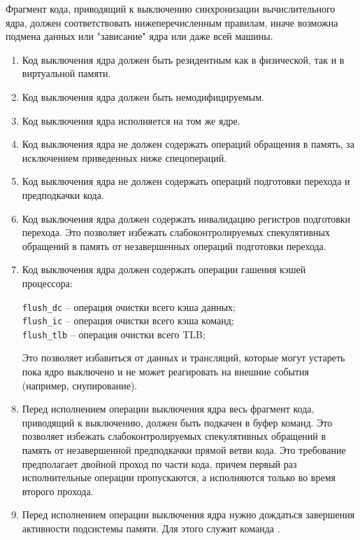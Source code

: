 \documentclass{article}
\begin{document}
Фрагмент кода, приводящий к выключению синхронизации вычислительного ядра,
должен соответствовать нижеперечисленным правилам, иначе возможна подмена данных
или "зависание" ядра или даже всей машины.
\begin{enumerate}

\item Код выключения ядра должен быть резидентным как в физической, так и в виртуальной памяти.

\item Код выключения ядра должен быть немодифицируемым.

\item Код выключения ядра исполняется на том же ядре.

\item Код выключения ядра не должен содержать операций обращения в память, за
исключением приведенных ниже спецопераций.

\item Код выключения ядра не должен содержать операций подготовки перехода и
предподкачки кода.

\item Код выключения ядра должен содержать инвалидацию регистров подготовки
перехода. Это позволяет избежать слабоконтролируемых спекулятивных обращений в
память от незавершенных операций подготовки перехода.

\item Код выключения ядра должен содержать операции гашения кэшей процессора:

\texttt{flush\_dc} -- операция очистки всего кэша данных; \\
\texttt{flush\_ic} -- операция очистки всего кэша команд; \\
\texttt{flush\_tlb} -- операция очистки всего TLB;

Это позволяет избавиться от данных и трансляций, которые могут устареть пока
ядро выключено и не может реагировать на внешние события (например,
снупирование).

\item Перед исполнением операции выключения ядра весь фрагмент кода, приводящий к
выключению, должен быть подкачен в буфер команд. Это позволяет избежать
слабоконтролируемых спекулятивных обращений в память от незавершенной
предподкачки прямой ветви кода. Это требование предполагает двойной проход по
части кода, причем первый раз исполнительные операции пропускаются, а
исполняются только во время второго прохода.

\item Перед исполнением операции выключения ядра нужно дождаться завершения
активности подсистемы памяти. Для этого служит команда {}.

\end{enumerate}
\end{document}
